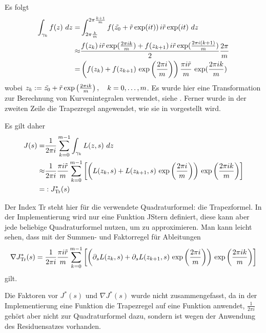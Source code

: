 \documentclass[a4paper,12pt]{report}
\newcommand{\zitat}[1]{\glqq #1\grqq}
\newcommand{\klammer}[1]{\left(#1\right)}
\newcommand{\1}{\mathds{1}}
\theoremstyle{plain} %
\theoremstyle{definition} %
\theoremstyle{remark}
\begin{document}
            Es folgt
            \begin{align}
                  \int_{\gamma_k} f(z)\ dz =& \int_{2 \pi \frac k m}^{2\pi \frac {k+1} m} f(\Tilde{z_0}+\Tilde r\exp(it))\,i\Tilde r\exp(it)\ dz\label{eqn: Teilintegral Kurve zu Intergral normal}\\
                  \approx& \frac{f(z_k)\,i\Tilde r\exp(\frac{2\pi i k}{m})+f(z_{k+1})\,i\Tilde r\exp(\frac{2\pi i (k+1)}{m})}{2} \frac{2\pi} m\nonumber\\
                  =& \klammer{f(z_k)+f(z_{k+1})\,\exp\klammer{\frac{2\pi i}{m}}}\frac{\pi i \Tilde r} m \,\exp(\frac{2\pi i k}{m})\nonumber
            \end{align}
            wobei $z_k:=\Tilde{z_0}+\Tilde r\exp\klammer{\frac {2\pi ik} m}, \quad k=0,\dots,m$.
            Es wurde hier eine Transformation zur Berechnung von Kurvenintegralen verwendet, siehe \cite[S. 21]{complexAnalysisVL}.
            Ferner wurde in der zweiten Zeile die Trapezregel angewendet, wie sie in \cite[S. 498]{numerikHermann} vorgestellt wird.
            
            Es gilt daher
            \begin{align}
                  J(s) =& \frac{1}{2\pi i}\sum_{k=0}^{m-1}\int_{\gamma_k} L(z,s)\ dz\nonumber\\
                  \approx& \frac{1}{2\pi i}\frac{\pi i \Tilde r} m\sum_{k=0}^{m-1}\left[\klammer{L(z_k, s)+L(z_{k+1}, s)\,\exp\klammer{\frac{2\pi i}{m}}}\,\exp\klammer{\frac{2\pi i k}{m}}\right]\label{def: JSternTrapez}\\
                  =&:J_{\text{Tr}}^*(s)\nonumber
            \end{align}

            Der Index \zitat{Tr} steht hier für die verwendete Quadraturformel: die Trapezformel.
            In der Implementierung wird nur eine Funktion \zitat{JStern} definiert, diese kann aber jede beliebige Quadraturformel nutzen, um \J zu approximieren.
            Man kann leicht sehen, dass mit der Summen- und Faktorregel für Ableitungen
            $$\nabla J_{\text{Tr}}^*(s) = \frac{1}{2\pi i}\frac{\pi i \Tilde r} m\sum_{k=0}^{m-1}\left[\klammer{\partial_s L(z_k, s)+\partial_s L(z_{k+1}, s)\,\exp\klammer{\frac{2\pi i}{m}}}\,\exp\klammer{\frac{2\pi i k}{m}}\right]$$
            gilt.

            Die Faktoren vor $J^*(s)$ und $\nabla J^*(s)$ wurde nicht zusammengefasst, da in der Implementierung eine Funktion die Trapezregel auf eine Funktion anwendet,
            $\frac 1 {2\pi i}$ gehört aber nicht zur Quadraturformel dazu, sondern ist wegen der Anwendung des Residuensatzes vorhanden.
\end{document}
